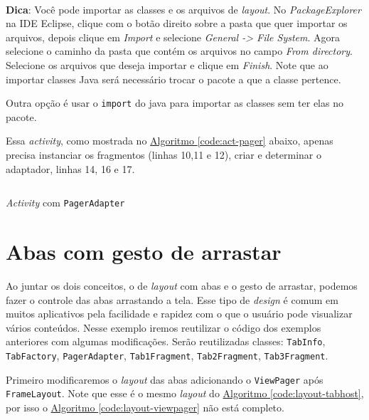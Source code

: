 \documentclass[a4paper,12pt,brazil,oneside]{book}
\begin{document}
\begin{singlespace}
	\begin{framed}
	\paragraph{}\textbf{Dica}: Você pode importar as classes e os arquivos de \emph{layout}. No \emph{PackageExplorer} na IDE Eclipse, clique com o botão direito sobre a pasta que quer importar os arquivos, depois clique em \emph{Import} e selecione \emph{General -> File System}. Agora selecione o caminho da pasta que contém os arquivos no campo \emph{From directory}. Selecione os arquivos que deseja importar e clique em \emph{Finish}.
	Note que ao importar classes Java será necessário trocar o pacote a que a classe pertence.
	
	Outra opção é usar o \texttt{import} do java para importar as classes sem ter elas no pacote.
	
	\textit{}
	\end{framed}

	Essa \emph{activity}, como mostrada no \hyperref[code:act-pager]{Algoritmo \ref*{code:act-pager}} abaixo, apenas precisa instanciar os fragmentos (linhas 10,11 e 12), criar e determinar o adaptador, linhas 14, 16 e 17.
	
	\begin{listing}[H]
	\inputminted[linenos=true,fontsize=\small,frame=lines, framesep=2mm, tabsize=2,numbersep=5pt]{java}{src/design/viewpager-activity.java}
	\caption{\emph{Activity} com \texttt{PagerAdapter}}
	\label{code:act-pager}
	\end{listing}

\section{Abas com gesto de arrastar}

	Ao juntar os dois conceitos, o de \emph{layout} com abas e o gesto de arrastar, podemos fazer o controle das abas arrastando a tela. Esse tipo de \emph{design} é comum em muitos aplicativos pela facilidade e rapidez com o que o usuário pode visualizar vários conteúdos. 
	Nesse exemplo iremos reutilizar o código dos exemplos anteriores com algumas modificações. Serão reutilizadas classes: \texttt{TabInfo}, \texttt{TabFactory}, \texttt{PagerAdapter}, \texttt{Tab1Fragment}, \texttt{Tab2Fragment}, \texttt{Tab3Fragment}.
	
	Primeiro modificaremos o \emph{layout} das abas adicionando o \texttt{ViewPager} após \texttt{FrameLayout}. Note que esse é o mesmo \emph{layout} do \hyperref[code:layout-tabhost]{Algoritmo \ref*{code:layout-tabhost}}, por isso o \hyperref[code:layout-viewpager]{Algoritmo \ref*{code:layout-viewpager}} não está completo.
	

\end{singlespace}
\end{document}
